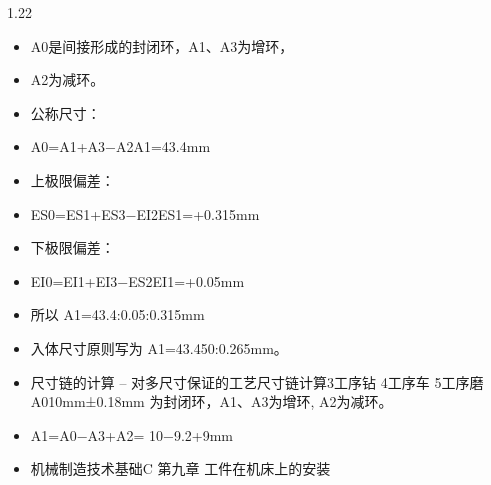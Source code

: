 \documentclass[12pt,a4paper]{article}
\begin{document}
\begin{spacing}{1.22}
\begin{itemize}[leftmargin=2.2em,label=--]
  \item A0是间接形成的封闭环，A1、A3为增环，
  \item A2为减环。
  \item 公称尺寸：
  \item A0=A1+A3−A2A1=43.4mm
  \item 上极限偏差：
  \item ES0=ES1+ES3−EI2ES1=+0.315mm
  \item 下极限偏差：
  \item EI0=EI1+EI3−ES2EI1=+0.05mm
  \item 所以 A1=43.4:0.05:0.315mm
  \item 入体尺寸原则写为 A1=43.450:0.265mm。
  \item 尺寸链的计算 – 对多尺寸保证的工艺尺寸链计算3工序钻 4工序车 5工序磨A010mm±0.18mm 为封闭环，A1、A3为增环, A2为减环。
  \item A1=A0−A3+A2= 10−9.2+9mm
  \item 机械制造技术基础C 第九章 工件在机床上的安装
\end{itemize}


\end{spacing}
\end{document}
